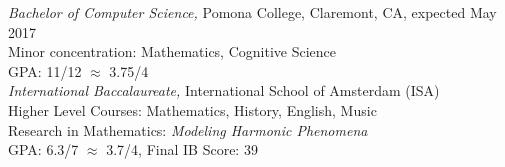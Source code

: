 {\sl Bachelor of Computer Science,}
Pomona College, Claremont, CA, expected May 2017 \\
Minor concentration: Mathematics, Cognitive Science \\
GPA: 11/12 $\approx$ 3.75/4 \\[0.2cm]
{\sl International Baccalaureate,}
International School of Amsterdam (ISA)\\
Higher Level Courses: Mathematics, History, English, Music \\
Research in Mathematics: \textit{Modeling Harmonic Phenomena} \\
GPA: 6.3/7 $\approx$ 3.7/4, Final IB Score: 39
